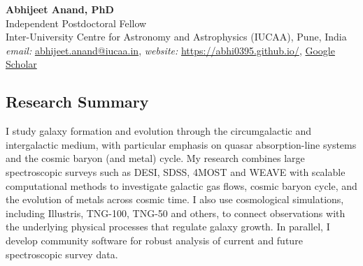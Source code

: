 \documentclass[11pt,letterpaper]{article}
\begin{document}
\thispagestyle{empty}\sloppy\sloppypar\raggedbottom

\textbf{\Large Abhijeet Anand, PhD}\\[0.5ex]
Independent Postdoctoral Fellow\\[0.5ex]
Inter-University Centre for Astronomy and Astrophysics (IUCAA), Pune, India\\[0.5ex]
\textsf{\small \textit{email:} \underline{abhijeet.anand@iucaa.in}, \textit{website:} \href{https://abhi0395.github.io/}{https://abhi0395.github.io/}, \href{https://scholar.google.com/citations?hl=en&user=MfOuq1IAAAAJ}{Google Scholar}}\\[0.5ex]

\subsection{Research Summary}

I study galaxy formation and evolution through the circumgalactic and intergalactic medium, with particular emphasis on quasar absorption-line systems and the cosmic baryon (and metal) cycle. My research combines large spectroscopic surveys such as DESI, SDSS, 4MOST and WEAVE with scalable computational methods to investigate galactic gas flows, cosmic baryon cycle, and the evolution of metals across cosmic time. I also use cosmological simulations, including Illustris, TNG-100, TNG-50 and others, to connect observations with the underlying physical processes that regulate galaxy growth. In parallel, I develop community software for robust analysis of current and future spectroscopic survey data.

\vspace{-1.5mm}
\end{document}
